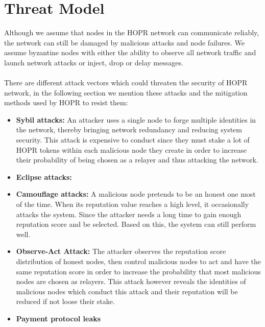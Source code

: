 \section{Threat Model}
Although we assume that nodes in the HOPR network can communicate reliably, the network can still be damaged by malicious attacks and node failures. We assume byzantine nodes with either the ability to observe all network traffic and launch network attacks or inject, drop or delay messages. 
\\~\\There are different attack vectors which could threaten the security of HOPR network, in the following section we mention these attacks and the mitigation methods used by HOPR to resist them:
\begin{itemize}
    \item \textbf{Sybil attacks:} An attacker uses a single node to forge multiple identities in the network, thereby bringing network redundancy and reducing system security. This attack is expensive to conduct since they must stake a lot of HOPR tokens within each malicious node they create in order to increase their probability of being chosen as a relayer and thus attacking the network. 
   \item \textbf{Eclipse attacks:}
   \item \textbf{Camouflage attacks:} A malicious node pretends to be an honest one most of the time. When its reputation value reaches a high level, it occasionally attacks the system. Since the attacker needs a long time to gain enough reputation score and be selected. Based on this, the system can still perform well.
   \item \textbf{Observe-Act Attack:} The attacker observes the reputation score distribution of honest nodes, then control malicious nodes to act and have the same reputation score in order to increase the probability that most malicious nodes are chosen as relayers.
   This attack however reveals the identities of malicious nodes which conduct this attack and their reputation will be reduced if not loose their stake.
   \item \textbf{Payment protocol leaks}
   
   
   
\end{itemize}

